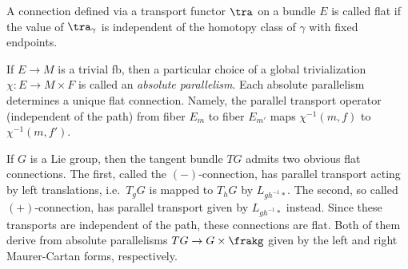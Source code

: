 \begin{defn}
    A connection defined via a transport functor $\tra$ on a bundle $E$ is called flat if the value of $\tra_\gamma$ is independent of the homotopy class of $\gamma$ with fixed endpoints.
\end{defn}


\begin{example}
    If $E\to M$ is a trivial \gls{fb}, then a particular choice of a global trivialization $\chi:E\to M\times F$ is called an \emph{absolute parallelism}. Each absolute parallelism determines a unique flat connection. Namely, the parallel transport operator (independent of the path) from fiber $E_m$ to fiber $E_{m'}$ maps $\chi^{-1}(m,f)$ to $\chi^{-1}(m,f')$.
\end{example}

\begin{example}\label{ex flat connections on G}
    If $G$ is a Lie group, then the tangent bundle $TG$ admits two obvious flat connections. The first, called the $(-)$-connection, has parallel transport acting by left translations, i.e.\ $T_g G$ is mapped to $T_h G$ by $L_{gh^{-1}\ast}$. The second, so called $(+)$-connection, has parallel transport given by $L_{gh^{-1}\ast}$ instead. Since these transports are independent of the path, these connections are flat. Both of them derive from absolute parallelisms $TG\to G\times\frakg$ given by the left and right Maurer-Cartan forms, respectively.
\end{example}



